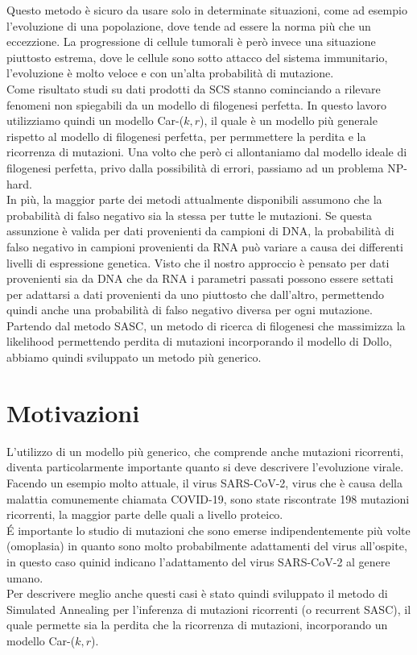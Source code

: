 \documentclass{report}
\begin{document}
  Questo metodo è sicuro da usare solo in determinate situazioni, come ad esempio l'evoluzione di una popolazione, dove tende ad essere la norma più che un eccezzione. La progressione di cellule tumorali è però invece una situazione piuttosto estrema, dove le cellule sono sotto attacco del sistema immunitario, l'evoluzione è molto veloce e con un'alta probabilità di mutazione.\\
  Come risultato studi su dati prodotti da SCS stanno cominciando a rilevare fenomeni non spiegabili da un modello di filogenesi perfetta.
  In questo lavoro utilizziamo quindi un modello Car-($k, r$), il quale è un modello più generale rispetto al modello di filogenesi perfetta, per permmettere la perdita e la ricorrenza di mutazioni.
  Una volto che però ci allontaniamo dal modello ideale di filogenesi perfetta, privo dalla possibilità di errori, passiamo ad un problema NP-hard.\\
  In più, la maggior parte dei metodi attualmente disponibili assumono che la probabilità di falso negativo sia la stessa per tutte le mutazioni. Se questa assunzione è valida per dati provenienti da campioni di DNA, la probabilità di falso negativo in campioni provenienti da RNA può variare a causa dei differenti livelli di espressione genetica.
  Visto che il nostro approccio è pensato per dati provenienti sia da DNA che da RNA i parametri passati possono essere settati per adattarsi a dati provenienti da uno piuttosto che dall'altro, permettendo quindi anche una probabilità di falso negativo diversa per ogni mutazione.\\
  Partendo dal metodo SASC, un metodo di ricerca di filogenesi che massimizza la likelihood permettendo perdita di mutazioni incorporando il modello di Dollo, abbiamo quindi sviluppato un metodo più generico.

  \section{Motivazioni}

  L'utilizzo di un modello più generico, che comprende anche mutazioni ricorrenti, diventa particolarmente importante quanto si deve descrivere l'evoluzione virale.\\
  Facendo un esempio molto attuale, il virus SARS-CoV-2, virus che è causa della malattia comunemente chiamata COVID-19, sono state riscontrate 198 mutazioni ricorrenti, la maggior parte delle quali a livello proteico.\\
  \'E importante lo studio di mutazioni che sono emerse indipendentemente più volte (omoplasia) in quanto sono molto probabilmente adattamenti del virus all'ospite, in questo caso quinid indicano l'adattamento del virus SARS-CoV-2 al genere umano.\\
  Per descrivere meglio anche questi casi è stato quindi sviluppato il metodo di Simulated Annealing per l'inferenza di mutazioni ricorrenti (o recurrent SASC), il quale permette sia la perdita che la ricorrenza di mutazioni, incorporando un modello Car-($k, r$).
\end{document}
